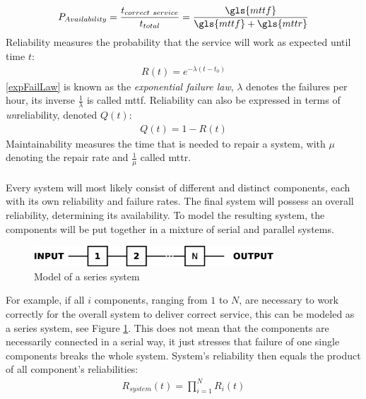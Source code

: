 \begin{align}\label{EQUavailability}
 P_{Availability} = \frac{t_{correct\ service}}{t_{total}} =  \frac{{\gls{mttf}}}{\gls{mttf}+\gls{mttr}}
\end{align}
Reliability measures the probability that the service will work as expected until time $t$:
\begin{align}\label{expFailLaw}
 R(t) = e^{-\lambda(t-t_0)}
\end{align}
\ref{expFailLaw} is known as the \textit{exponential failure law}, $\lambda$ denotes the failures per hour, its inverse $\frac{1}{\lambda}$ is
called \gls{mttf}. Reliability can also be expressed in terms of \textit{un}reliability, denoted $Q(t)$:
\begin{align}
 Q(t) = 1 - R(t)
\end{align}
Maintainability measures the time that is needed to repair a system, with $\mu$ denoting the repair rate and $\frac{1}{\mu}$ called \gls{mttr}.
\\
\\
Every system will most likely consist of different and distinct components, each with its own reliability and failure rates. The final system
will possess an overall reliability, determining its availability. To model the resulting system, the components will be put together in a mixture of
serial and parallel systems.
\begin{figure}
    \centering
    \includegraphics[width=0.8\textwidth]{figures/seriesSystem.eps}
    \caption{Model of a series system}
    \label{fig:serSys}
\end{figure}
For example, if all $i$ components, ranging from $1$ to $N$, are necessary to work correctly for the overall system to deliver correct service, this can be modeled as
a series system, see Figure \ref{fig:serSys}. This does not mean that the components are necessarily connected in a serial way, it just stresses that failure
of one single components breaks the whole system. System's reliability then equals the product of all component's reliabilities:
\begin{align}
R_{system}(t) = \prod_{i=1}^{N} R_{i}(t) 
\end{align}
